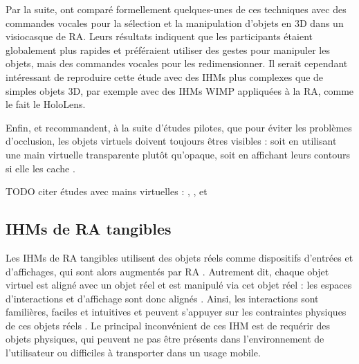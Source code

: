 
Par la suite, \cite{Piumsomboon2014} ont comparé formellement quelques-unes de ces techniques avec des commandes vocales pour la sélection et la manipulation d'objets en 3D dans un visiocasque de RA. Leurs résultats indiquent que les participants étaient globalement plus rapides et préféraient utiliser des gestes pour manipuler les objets, mais des commandes vocales pour les redimensionner. Il serait cependant intéressant de reproduire cette étude avec des IHMs plus complexes que de simples objets 3D, par exemple avec des IHMs WIMP appliquées à la RA, comme le fait le HoloLens.


Enfin, \cite{Piumsomboon2013} et \cite{Piumsomboon2014} recommandent, à la suite d'études pilotes, que pour éviter les problèmes d'occlusion, les objets virtuels doivent toujours êtres visibles : soit en utilisant une main virtuelle transparente plutôt qu'opaque, soit en affichant leurs contours si elle les cache .

TODO citer études avec mains virtuelles : \cite{Chan2010}, \cite{Markussen2014}, \cite{Hincapie-Ramos2014} et \cite{Jones2012}

\subsection{IHMs de RA tangibles}
\label{subsec:litterature_ar_hci_tui}

Les IHMs de RA tangibles utilisent des objets réels comme dispositifs d'entrées et d'affichages, qui sont alors augmentés par RA \citep{Kato2000}. Autrement dit, chaque objet virtuel est aligné avec un objet réel et est manipulé via cet objet réel \citep{Billinghurst2005} : les espaces d'interactions et d'affichage sont donc alignés \citep[p. 170]{Billinghurst2015}. Ainsi, les interactions sont familières, faciles et intuitives et peuvent s'appuyer sur les contraintes physiques de ces objets réels \citep{Zhou2008}. Le principal inconvénient de ces IHM est de requérir des objets physiques, qui peuvent ne pas être présents dans l'environnement de l'utilisateur ou difficiles à transporter dans un usage mobile.

